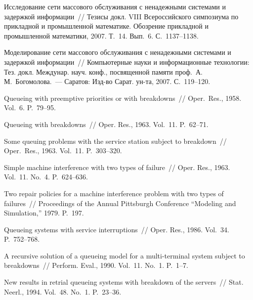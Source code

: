 \begin{multicols}{2}
{{\begin{thebibliography}{99}
Исследование сети массового обслуживания с ненадежными системами и задержкой информации~//
Тезисы докл. VIII Всероссийского симпозиума по прикладной и промышленной математике.
Обозрение прикладной и промышленной математики, 2007. Т.~14. Вып.~6. С.~1137--1138.

Моделирование сети массового обслуживания с ненадежными системами и задержкой информации~//
Компьютерные науки и информационные технологии: Тез. докл. Междунар. науч. конф.,
посвященной памяти проф.\ А.\,М.~Богомолова.~--- Саратов: Изд-во Сарат. ун-та, 2007.\linebreak
С.~119--120.


Queueing with preemptive priorities or with breakdowns~//
Oper.\ Res., 1958. Vol.~6. P.~79--95.

Queueing with breakdowns~// Oper. Res., 1963. Vol.~11. P.~62--71.

Some queuing problems with the service station subject to breakdown~//
Oper.\ Res., 1963. Vol.~11. P.~303--320.

Simple machine interference with two types of failure~//
Oper. Res., 1963. Vol.~11. No.~4. P.~624--636.

Two repair policies for a machine interference problem with two types of failures~//
Proceedings of the Annual Pittsburgh Conference ``Modeling and Simulation,'' 1979. P.~197.

Queueing systems with service interruptions~//
Oper. Res., 1986. Vol.~34. P.~752--768.

A recursive solution of a queueing model for a multi-terminal system subject to breakdowns~//
Perform. Eval., 1990. Vol.~11. No.~1. P.~1--7.

New results in retrial queueing systems with breakdown of the servers~//
Stat. Neerl., 1994. Vol.~48. No.~1. P.~23--36.


\end{thebibliography}}}
\end{multicols}
